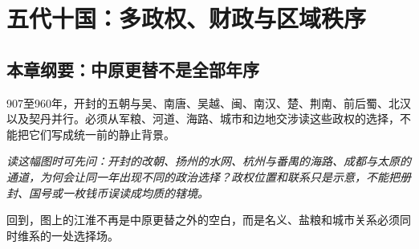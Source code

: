 \chapter{五代十国：多政权、财政与区域秩序}
\label{ch:five-dynasties-ten-kingdoms}
\section{本章纲要：中原更替不是全部年序}
907至960年，开封的五朝与吴、南唐、吴越、闽、南汉、楚、荆南、前后蜀、北汉以及契丹并行。必须从军粮、河道、海路、城市和边地交涉读这些政权的选择，不能把它们写成统一前的静止背景。



\noindent\textit{读这幅图时可先问：开封的改朝、扬州的水网、杭州与番禺的海路、成都与太原的通道，为何会让同一年出现不同的政治选择？政权位置和联系只是示意，不能把册封、国号或一枚钱币误读成均质的辖境。}

\noindent 回到，图上的江淮不再是中原更替之外的空白，而是名义、盐粮和城市关系必须同时维系的一处选择场。

